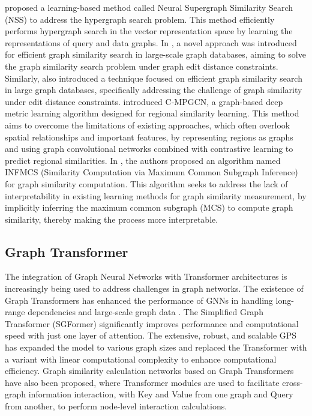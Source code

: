 \cite{47} proposed a learning-based method called Neural Supergraph Similarity Search (NSS) to address the hypergraph search problem. This method efficiently performs hypergraph search in the vector representation space by learning the representations of query and data graphs. In \cite{48}, a novel approach was introduced for efficient graph similarity search in large-scale graph databases, aiming to solve the graph similarity search problem under graph edit distance constraints. Similarly, \cite{49} also introduced a technique focused on efficient graph similarity search in large graph databases, specifically addressing the challenge of graph similarity under edit distance constraints. \cite{50} introduced C-MPGCN, a graph-based deep metric learning algorithm designed for regional similarity learning. This method aims to overcome the limitations of existing approaches, which often overlook spatial relationships and important features, by representing regions as graphs and using graph convolutional networks combined with contrastive learning to predict regional similarities. In \cite{51}, the authors proposed an algorithm named INFMCS (Similarity Computation via Maximum Common Subgraph Inference) for graph similarity computation. This algorithm seeks to address the lack of interpretability in existing learning methods for graph similarity measurement, by implicitly inferring the maximum common subgraph (MCS) to compute graph similarity, thereby making the process more interpretable.

\subsection{Graph Transformer}
The integration of Graph Neural Networks with Transformer architectures is increasingly being used to address challenges in graph networks. The existence of Graph Transformers has enhanced the performance of GNNs in handling long-range dependencies and large-scale graph data \cite{32,33}. The Simplified Graph Transformer (SGFormer) \cite{34} significantly improves performance and computational speed with just one layer of attention. The extensive, robust, and scalable GPS \cite{35} has expanded the model to various graph sizes and replaced the Transformer with a variant with linear computational complexity to enhance computational efficiency. Graph similarity calculation networks based on Graph Transformers \cite{36,37} have also been proposed, where Transformer modules are used to facilitate cross-graph information interaction, with Key and Value from one graph and Query from another, to perform node-level interaction calculations.